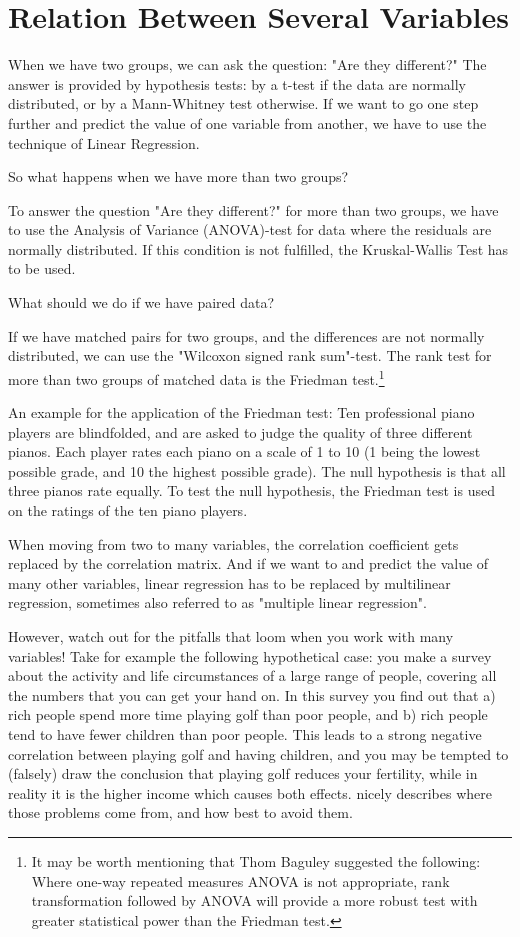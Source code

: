 \chapter{Relation Between Several Variables}

When we have two groups, we can ask the question: "Are they different?" The answer is provided by hypothesis tests: by a t-test if the data are normally distributed, or by a Mann-Whitney test otherwise. If we want to go one step further and predict the value of one variable from another, we have to use the technique of Linear Regression.

So what happens when we have more than two groups?

To answer the question "Are they different?" for more than two groups, we have to use the Analysis of Variance (ANOVA)-test for data where the residuals are normally distributed. If this condition is not fulfilled, the Kruskal-Wallis Test has to be used.

What should we do if we have paired data?

If we have matched pairs for two groups, and the differences are not normally distributed, we can use the "Wilcoxon signed rank sum"-test. The rank test for more than two groups of matched data is the Friedman test.\footnote{It may be worth mentioning that Thom Baguley suggested the following: Where one-way repeated measures ANOVA is not appropriate, rank transformation followed by ANOVA will provide a more robust test with greater statistical power than the Friedman test.}

An example for the application of the Friedman test: Ten professional piano players are blindfolded, and are asked to judge the quality of three different pianos. Each player rates each piano on a scale of 1 to 10 (1 being the lowest possible grade, and 10 the highest possible grade). The null hypothesis is that all three pianos rate equally. To test the null hypothesis, the Friedman test is used on the ratings of the ten piano players.

When moving from two to many variables, the correlation coefficient gets replaced by the correlation matrix. And if we want to and predict the value of many other variables, linear regression has to be replaced by multilinear regression, sometimes also referred to as "multiple linear regression".

However, watch out for the pitfalls that loom when you work with many variables! Take for example the following hypothetical case: you make a survey about the activity and life circumstances of a large range of people, covering all the numbers that you can get your hand on. In this survey you find out that a) rich people spend more time playing golf than poor people, and b) rich people tend to have fewer children than poor people. This leads to a strong negative correlation between playing golf and having children, and you may be tempted to (falsely) draw the conclusion that playing golf reduces your fertility, while in reality it is the higher income which causes both effects. \cite{Kaplan2009} nicely describes where those problems come from, and how best to avoid them.

